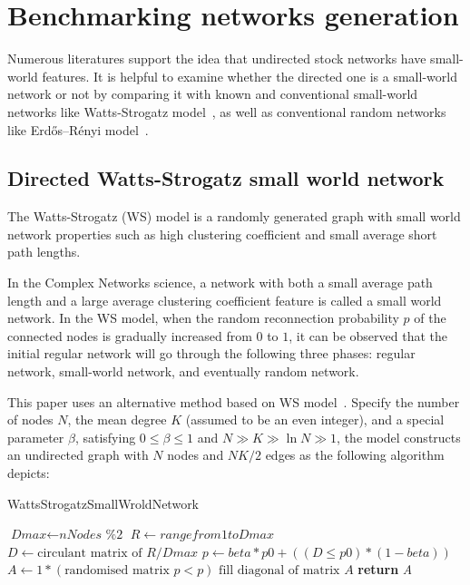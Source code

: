 \chapter{Benchmarking networks generation}
Numerous literatures support the idea that undirected stock networks have small-world features. It is helpful to examine whether the directed one is a small-world network or not by comparing it with known and conventional small-world networks like Watts-Strogatz model~\cite{watts1998collective}, as well as conventional random networks like Erdős–Rényi model~\cite{random}.

\section{Directed Watts-Strogatz small world network}
The Watts-Strogatz (WS) model is a randomly generated graph with small world network properties such as high clustering coefficient and small average short path lengths.

In the Complex Networks science, a network with both a small average path length and a large average clustering coefficient feature is called a small world network. In the WS model, when the random reconnection probability $p$ of the connected nodes is gradually increased from $0$ to $1$, it can be observed that the initial regular network will go through the following three phases: regular network, small-world network, and eventually random network.

This paper uses an alternative method based on WS model~\cite{song2014simple}. Specify the number of nodes $N$, the mean degree $K$ (assumed to be an even integer), and a special parameter $\beta$, satisfying $0\leq \beta \leq 1$ and $N\gg K\gg \ln N\gg 1$, the model constructs an undirected graph with $N$ nodes and ${NK}/{2}$ edges as the following algorithm depicts:

\begin{algorithm}[H]
	\caption{WattsStrogatzSmallWroldNetwork}\label{alg:smallworld}
	\begin{algorithmic}[1]
		\State $\textit{Dmax} \gets \textit{nNodes \% 2}$
		\State $\textit{R} \gets range from 1 to \textit{Dmax}$
		\State $\textit{D} \gets \text{circulant matrix of } \textit{R}/\textit{Dmax}$
		\State $\textit{p} \gets \textit{beta}*\textit{p0}+((\textit{D} \leq \textit{p0})*(1-\textit{beta}))$
		\State $\textit{A} \gets 1*(\text{randomised matrix }\textit{p} < p)$
		\State $\text{fill diagonal of matrix }\textit{A}$
		\State \textbf{return} {\textit{A}}
		\EndProcedure
	\end{algorithmic}
\end{algorithm}

